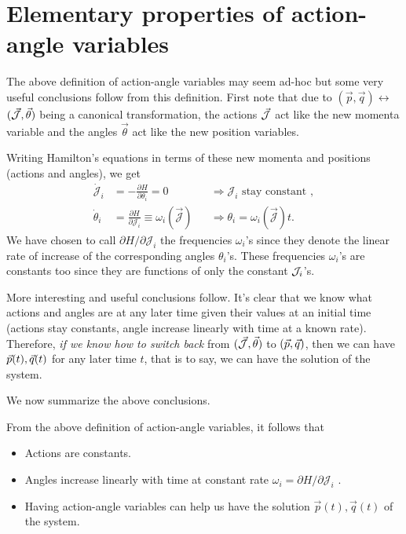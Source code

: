 \section{Elementary properties of action-angle variables}

The above definition of action-angle variables may seem ad-hoc 
but some very useful conclusions follow from this definition.
First note that due to 
 $( \vec{p}, \vec{q}) \leftrightarrow $ {$ (  \vec{\cal{J}} , \vec{\theta})$} 
 being a canonical transformation, the actions 
 $\vec{\cal{J}} $ act like the new momenta variable and the 
 angles $\vec{\theta}$ act like the new position variables.
 
 
 Writing Hamilton's equations in terms of these new momenta and
 positions (actions and angles), we get
\begin{align}              
\dot{\mathcal{J}}_{i}  &=   -  \frac{\partial H}{ \partial \theta_{i}}    =0    &&   \Longrightarrow \mathcal{J}_{i} \text { stay constant } ,  \label{AA_eqn_1}   \\ 
\dot{\theta}_{i}   &=   \frac{\partial H }{ \partial \mathcal{J}_{i}} \equiv \omega_{i}(\overrightarrow{\mathcal{J}})     && \Longrightarrow \theta_{i}=\omega_{i}(\overrightarrow{\mathcal{J}}) t. \label{AA_eqn_2} 
\end{align}
We have chosen to 
call $\partial H/ \partial \mathcal{J}_{i} $ the frequencies $\omega_i$'s
since they denote the linear rate of increase of the 
corresponding angles $\theta_i$'s. These frequencies $\omega_i$'s are 
constants too since they are functions of only the constant $\mathcal{J}_i$'s.



More interesting and useful conclusions follow. It's clear that we know what 
actions and angles are at any later time given their values at an initial time
(actions stay constants, angle increase linearly with time at a known rate).
Therefore, \textit{if we know how to switch back} from $(  \vec{\cal{J}} , \vec{\theta})$
to $(\vec{p}, \vec{q})$, then we can have $\vec{p}(t), \vec{q}(t)$ for any later time $t$,
that is to say, we can have the solution of the system.


We now summarize the above conclusions.\\
\begin{tcolorbox}
From the above definition of action-angle variables, it follows that
\begin{itemize}
\item Actions are constants.
\item Angles increase linearly with time at constant  rate $\omega_i  =  \partial H/ \partial \mathcal{J}_{i} $ .
\item Having action-angle variables can help us have the solution $\vec{p}(t), \vec{q}(t)$ of the system.
\end{itemize}
\end{tcolorbox}




